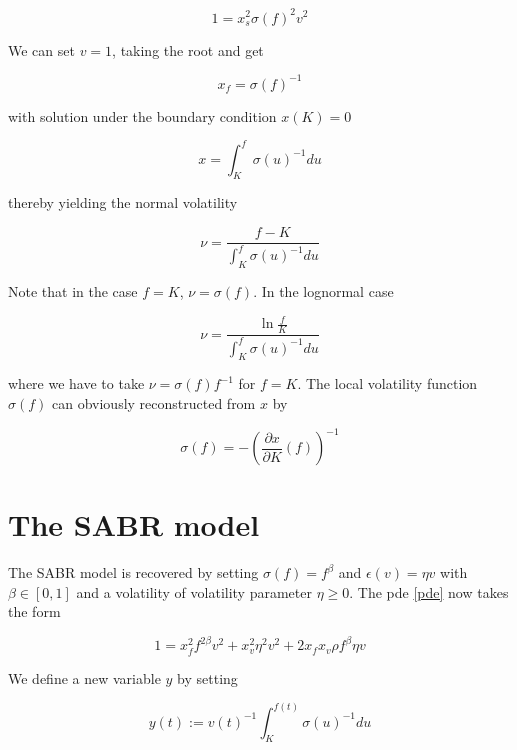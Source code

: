 \documentclass{amsart}
\theoremstyle{plain}
\numberwithin{equation}{section}
\begin{document}
\begin{equation}
1 = x_s^2\sigma(f)^2v^2
\end{equation}

We can set $v=1$, taking the root and get

\begin{equation}
x_f = \sigma(f)^{-1}
\end{equation}

with solution under the boundary condition $x(K) = 0$

\begin{equation}
x = \int_{K}^f \sigma(u)^{-1} du
\end{equation}

thereby yielding the normal volatility

\begin{equation}
\nu = \frac{f-K}{\int_{K}^f \sigma(u)^{-1} du}
\end{equation}

Note that in the case $f=K$, $\nu=\sigma(f)$. In the lognormal case

\begin{equation}
\nu = \frac{\ln \frac{f}{K}} {\int_{K}^f \sigma(u)^{-1} du}
\end{equation}

where we have to take $\nu = \sigma(f) f^{-1}$ for $f=K$. The local volatility function $\sigma(f)$ can obviously reconstructed from $x$ by

\begin{equation}\label{localvolfromx}
\sigma(f) = - \left( \frac{\partial x}{\partial K}(f) \right) ^{-1}
\end{equation}


\section{The SABR model}

The SABR model is recovered by setting $\sigma(f)=f^\beta$ and $\epsilon(v)=\eta v$ with $\beta \in [0,1]$ and a volatility of volatility parameter $\eta \geq 0$.
The pde \ref{pde} now takes the form

\begin{equation}\label{pdesabr}
1 = x_f^2 f^{2\beta} v^2 + x_v^2 \eta^2 v^2 + 2 x_f x_v \rho f^\beta \eta v
\end{equation}

We define a new variable $y$ by setting

\begin{equation}\label{defsabry}
y(t) := v(t)^{-1}\int_{K}^{f(t)} \sigma(u)^{-1} du
\end{equation}
\end{document}

